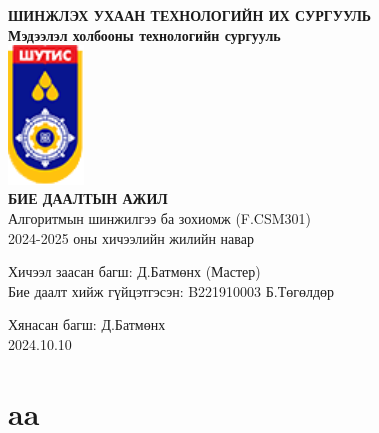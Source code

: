 \documentclass[a4paper]{article}
\begin{document}
	\begin{titlepage}
		\centering
		
		{\Large\bfseries ШИНЖЛЭХ УХААН ТЕХНОЛОГИЙН ИХ СУРГУУЛЬ\\
			Мэдээлэл холбооны технологийн сургууль}\\[2em]

		\includegraphics[width=0.15\textwidth]{shutis.png}\\[2em]

		{\LARGE\bfseries БИЕ ДААЛТЫН АЖИЛ}\\[1em]
		{\large Алгоритмын шинжилгээ ба зохиомж (F.CSM301)\\
			2024-2025 оны хичээлийн жилийн навар}\\[4em]
		
		\begin{flushleft}
			\large
			Хичээл заасан багш: \hfill Д.Батмөнх  (Мастер)\\[1em]
			Бие даалт хийж гүйцэтгэсэн: \hfill B221910003 Б.Төгөлдөр
		\end{flushleft}
		\vspace{25em}
		
		{\small
			Хянасан багш: Д.Батмөнх\\}
		\vspace{1em}
		2024.10.10
		
	\end{titlepage}
	\newpage
	\section{aa}
\end{document}
